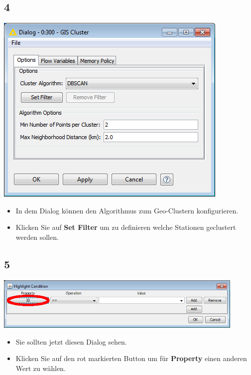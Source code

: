 \documentclass{beamer}
\begin{document}
\subsection{4}
\begin{frame}
	\begin{center}
  		\includegraphics[height=0.6\textheight]{4.png}
	\end{center}
	\begin{itemize}
		\item In dem Dialog können den Algorithmus zum Geo-Clustern konfigurieren.
		\item Klicken Sie auf \textbf{Set Filter} um zu definieren welche Stationen geclustert werden sollen.
	\end{itemize}
\end{frame}

\subsection{5}
\begin{frame}
	\begin{center}
  		\includegraphics[width=0.9\textwidth]{5.png}
	\end{center}
	\begin{itemize}
		\item Sie sollten jetzt diesen Dialog sehen.
		\item Klicken Sie auf den rot markierten Button um für \textbf{Property} einen anderen Wert zu wählen.
	\end{itemize}
\end{frame}
\end{document}
